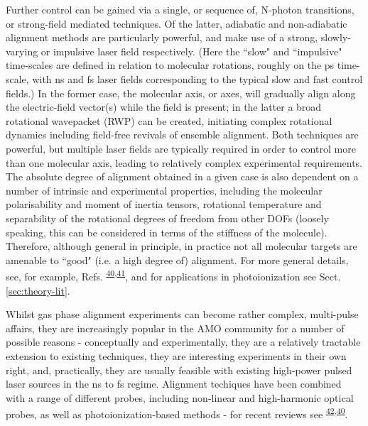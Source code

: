 \documentclass[10pt]{article}
\begin{document}
Further control can be gained via a single, or sequence of, N-photon transitions, or strong-field mediated techniques. Of the latter, adiabatic and non-adiabatic alignment methods are particularly powerful, and make use of a strong, slowly-varying or impulsive laser field respectively. (Here the ``slow" and ``impulsive" time-scales are defined in relation to molecular rotations, roughly on the ps time-scale, with ns and fs laser fields corresponding to the typical slow and fast control fields.) In the former case, the molecular axis, or axes, will gradually align along the electric-field vector(s) while the field is present; in the latter a broad rotational wavepacket (RWP) can be created, initiating complex rotational dynamics including field-free revivals of ensemble alignment. Both techniques are powerful, but multiple laser fields are typically required in order to control more than one molecular axis, leading to relatively complex experimental requirements. The absolute degree of alignment obtained in a given case is also dependent on a number of intrinsic and experimental properties, including the molecular polarisability 
and moment of inertia tensors, rotational temperature and separability of the rotational degrees of freedom from other DOFs (loosely speaking, this can be considered in terms of the stiffness of the molecule). Therefore, although general in principle, in practice not all molecular targets are amenable to ``good" (i.e. a high degree of) alignment. For more general details, see, for example, Refs. \textsuperscript{\hyperref[csl:40]{40},\hyperref[csl:41]{41}}, and for applications in photoionization see Sect. \ref{sec:theory-lit}.

Whilst gas phase alignment experiments can become rather complex, multi-pulse affairs, they are increasingly popular in the AMO community for a number of possible reasons - conceptually and experimentally, they are a relatively tractable extension to existing techniques, they are interesting experiments in their own right, and, practically, they are usually feasible with existing high-power pulsed laser sources in the ns to fs regime. Alignment techiques have been combined with a range of different probes, including non-linear and high-harmonic optical probes, as well as photoionization-based methods - for recent reviews see \textsuperscript{\hyperref[csl:42]{42},\hyperref[csl:40]{40}}. 
\end{document}
